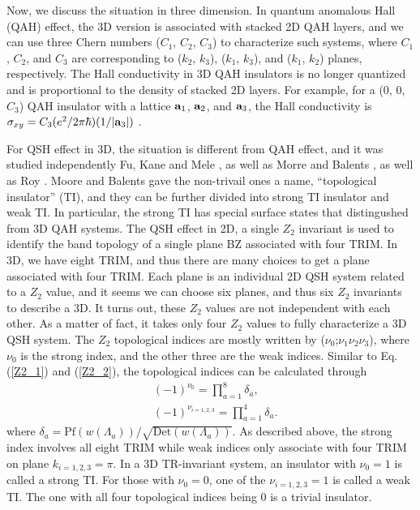 Now, we discuss the situation in three dimension. In quantum anomalous Hall (QAH) effect, the 3D version is associated with stacked 2D QAH layers, and we can use three Chern numbers ($C_1$, $C_2$, $C_3$) to characterize such systems, where $C_1$, $C_2$, and $C_3$ are corresponding to ($k_2$, $k_3$), ($k_1$, $k_3$), and ($k_1$, $k_2$) planes, respectively. The Hall conductivity in 3D QAH insulators is no longer quantized and is proportional to the density of stacked 2D layers. For example, for a (0, 0, $C_3$) QAH insulator with a lattice ${\bf a}_1$, ${\bf a}_2$, and ${\bf a}_3$, the Hall conductivity is $\sigma_{xy} = C_3 (e^2/2\pi \hbar) (1/|{\bf a}_3|)$ \cite{vanderbilt2018berry}. 

For QSH effect in 3D, the situation is different from QAH effect, and it was studied independently Fu, Kane and Mele \cite{fu2007}, as well as Morre and Balents \cite{moore2007topological}, as well as Roy \cite{roy2009topological}. Moore and Balents gave the non-trivail ones a name, ``topological insulator'' (TI), and they can be further divided into strong TI insulator and weak TI. In particular, the strong TI has special surface states that distingushed from 3D QAH systems. The QSH effect in 2D, a single $Z_2$ invariant is used to identify the band topology of a single plane BZ associated with four TRIM. In 3D, we have eight TRIM, and thus there are many choices to get a plane associated with four TRIM. Each plane is an individual 2D QSH system related to a $Z_2$ value, and it seems we can choose six planes, and thus six $Z_2$ invariants to describe a 3D. It turns out, these $Z_2$ values are not independent with each other. As a matter of fact, it takes only four $Z_2$ values to fully characterize a 3D QSH system. The $Z_2$ topological indices are mostly written by ($\nu_0$;$\nu_1\nu_2\nu_3$), where $\nu_0$ is the strong index, and the other three are the weak indices. Similar to Eq. (\ref{Z2_1}) and (\ref{Z2_2}), the topological indices can be calculated through
	\begin{equation}
		\label{Z2_1}
		\begin{aligned}
			&(-1)^{\nu_0} = 
			\prod_{a=1}^{8}  \delta_a,\\
			&(-1)^{\nu_{i=1,2,3}} = 
			\prod_{a=1}^{4}  \delta_a.
		\end{aligned}
	\end{equation}
where $\delta_a = \text{Pf} (w(\Lambda_a) )/ \sqrt{\text{Det}( w(\Lambda_a))  }$. As described above, the strong index involves all eight TRIM while weak indices only associate with four TRIM on plane $k_{i=1,2,3} = \pi$. In a 3D TR-invariant system, an insulator with $\nu_0=1$ is called a strong TI. For those with $\nu_0=0$, one of the $\nu_{i=1,2,3}=1$ is called a weak TI. The one with all four topological indices being 0 is a trivial insulator.

